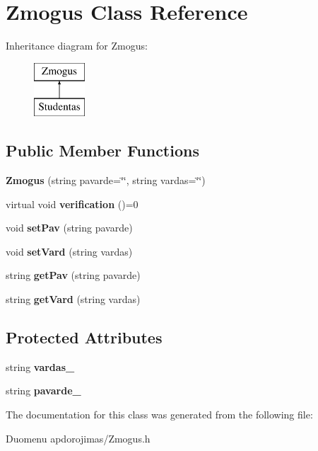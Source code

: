 \hypertarget{class_zmogus}{}\section{Zmogus Class Reference}
\label{class_zmogus}
Inheritance diagram for Zmogus\+:\begin{figure}[H]
\begin{center}
\leavevmode
\includegraphics[height=2.000000cm]{class_zmogus}
\end{center}
\end{figure}
\subsection*{Public Member Functions}
\begin{DoxyCompactItemize}
\item 
\mbox{\label{class_zmogus_aa34afb250de9900c93e74a2930a3eb5b}} 
{\bfseries Zmogus} (string pavarde=\char`\"{}\char`\"{}, string vardas=\char`\"{}\char`\"{})
\item 
\mbox{\label{class_zmogus_ab420b9f25ba0f79406beefcfafe76265}} 
virtual void {\bfseries verification} ()=0
\item 
\mbox{\label{class_zmogus_a1c1e4c628e3208fcdddcdfd881713610}} 
void {\bfseries set\+Pav} (string pavarde)
\item 
\mbox{\label{class_zmogus_abc001269403a3b63eec160a5863335a2}} 
void {\bfseries set\+Vard} (string vardas)
\item 
\mbox{\label{class_zmogus_a93eabe3d333bd02237ad11d6b2b68cbd}} 
string {\bfseries get\+Pav} (string pavarde)
\item 
\mbox{\label{class_zmogus_ad345ffc095208dc050d1e5705eb31147}} 
string {\bfseries get\+Vard} (string vardas)
\end{DoxyCompactItemize}
\subsection*{Protected Attributes}
\begin{DoxyCompactItemize}
\item 
\mbox{\label{class_zmogus_a09b290c9be6039ce3a94e1557def9b3a}} 
string {\bfseries vardas\+\_\+}
\item 
\mbox{\label{class_zmogus_a95b83ef4d9bbe9b88d78c17563bafa5a}} 
string {\bfseries pavarde\+\_\+}
\end{DoxyCompactItemize}


The documentation for this class was generated from the following file\+:\begin{DoxyCompactItemize}
\item 
Duomenu apdorojimas/Zmogus.\+h\end{DoxyCompactItemize}
